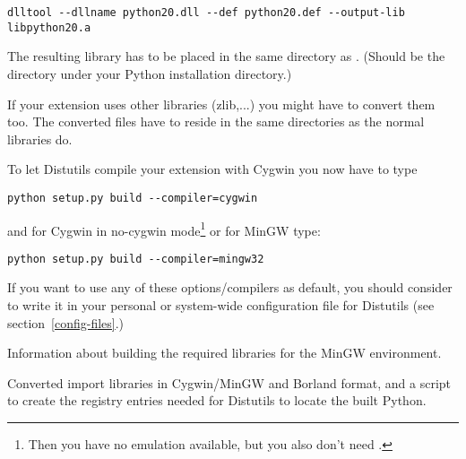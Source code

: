 \documentclass{howto}
\begin{document}
\begin{verbatim}
dlltool --dllname python20.dll --def python20.def --output-lib libpython20.a
\end{verbatim}

The resulting library has to be placed in the same directory as 
. (Should be the  directory under your
Python installation directory.)

If your extension uses other libraries (zlib,...) you might 
have to convert them too.
The converted files have to reside in the same directories as the normal
libraries do.

To let Distutils compile your extension with Cygwin you now have to type

\begin{verbatim}
python setup.py build --compiler=cygwin
\end{verbatim}

and for Cygwin in no-cygwin mode\footnote{Then you have no
\POSIX{} emulation available, but you also don't need
.} or for MinGW type:
 
\begin{verbatim}
python setup.py build --compiler=mingw32
\end{verbatim}

If you want to use any of these options/compilers as default, you should
consider to write it in your personal or system-wide configuration file
for Distutils (see section~\ref{config-files}.)

\begin{seealso}
    {Information about building the required libraries for the MinGW
     environment.}

    {Converted import libraries in Cygwin/MinGW and Borland format,
     and a script to create the registry entries needed for Distutils
     to locate the built Python.}
\end{seealso}
\end{document}
